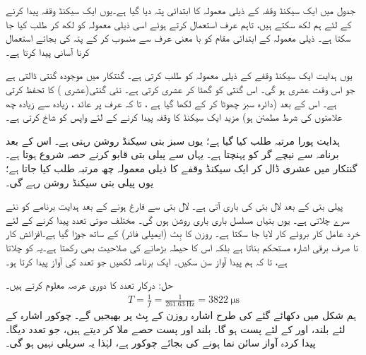 جدول  میں ایک سیکنڈ وقفہ کے ذیلی معمولہ کا ابتدائی پتہ  دیا گیا ہے۔یوں ایک سیکنڈ وقفہ پیدا کرنے کے لئے ہم  لکھ سکتے ہیں، تاہم عرف استعمال کرتے ہوئے اسی ذیلی معمولہ کو  لکھ کر  طلب کیا جا سکتا ہے۔ ذیلی معمولہ کے ابتدائی مقام کو با  معنی   عرف  سے منسوب کر کے پتہ کی بجائے استعمال کرنا  آسانی پیدا کرتا ہے۔

یوں  ہدایت  ایک سیکنڈ وقفے کے ذیلی معمولہ کو طلب  کرتی ہے۔ گنتکار میں موجودہ گنتی ڈالتی ہے جو اس وقت  عشری  ہو گی۔ \DCR{\regA} اس گنتی کو گھٹا کر عشری  کرتی ہے۔   نئی گنتی(عشری   ) کا تحفظ کرتی ہے۔ اس کے بعد  (دائرہ سبز چھوٹا کر کے لکھا گیا ہے ، تا کہ عرف پر عائد ، زیادہ سے زیادہ  چھ علامتوں کی شرط مطمئن  ہو)  مزید ایک سیکنڈ کا  وقفہ پیدا کرنے کے لئے واپس  کو شاخ کرتی ہے۔

ہدایت  پورا  مرتبہ طلب کیا گیا ہے؛ یوں سبز بتی  سیکنڈ روشن  رہتی ہے۔ اس کے بعد برنامہ  سے نیچے گر کو   پہنچتا ہے۔ یہاں سے پیلی بتی قابو کرنے حصہ  شروع ہوتا ہے۔ گنتکار  میں عشری  ڈال کر ایک سیکنڈ وقفے کا ذیلی معمولہ  چھ مرتبہ طلب کیا جاتا ہے؛ یوں پیلی بتی  سیکنڈ روشن رہے گی۔

پیلی بتی کے بعد لال بتی کی باری آتی ہے۔ لال بتی  سے فارغ ہونے کے بعد  ہدایت  برنامے کو نئے سرے  چلاتی ہے۔ یوں بتیاں مسلسل باری باری روشن ہوں گی۔
 مختلف صوتی تعدد   پیدا کرنے کے لئے  خرد عامل کار بروئے کار لایا  جا سکتا ہے۔ روزن  کا بِٹ  (ایمپلی فائر)  کے ساتھ  جوڑا گیا ہے۔افزائش کار نا صرف برقی اشارہ مستحکم بناتا ہے بلکہ اس کا حیطہ بڑھانے کی صلاحیت بھی رکھتا ہے۔یہ     کو چلاتا ہے، تا کہ ہم  پیدا آواز  سن سکیں۔ ایک برنامہ لکھیں جو  تعدد کی آواز پیدا کرتا ہو۔

حل:\quad
درکار تعدد کا دوری عرصہ معلوم کرتے ہیں۔
\begin{align*}
T=\frac{1}{f}=\frac{1}{\SI{261.63}{\hertz}}=\SI{3822}{\micro\second}
\end{align*}
ہم شکل   میں دکھائے گئے کی  طرح  اشارہ  روزن  کے بِٹ  پر بھیجیں گے۔  چوکور اشارہ  کے لئے بلند، اور  کے لئے پست ہو گا۔ بلند اور پست حصے ملا کر  دیتے ہیں، جو  تعدد دیگا۔  پیدا کردہ  آواز سائن نما ہونے کی بجائے چوکور ہے، لہٰذا  یہ  سریلی  نہیں ہو گی۔

